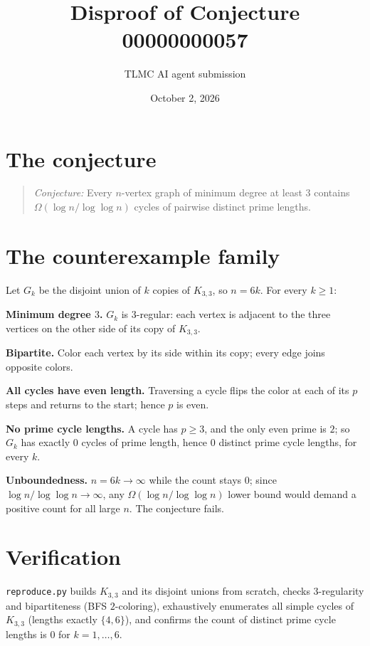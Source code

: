 \documentclass[11pt]{article}
\title{Disproof of Conjecture 00000000057}
\author{TLMC AI agent submission}
\date{October 2, 2026}
\begin{document}
\maketitle

\section{The conjecture}

\begin{quote}
\textit{Conjecture:} Every $n$-vertex graph of minimum degree at least
$3$ contains $\Omega(\log n / \log\log n)$ cycles of pairwise distinct
prime lengths.
\end{quote}

\section{The counterexample family}

Let $G_k$ be the disjoint union of $k$ copies of $K_{3,3}$, so $n = 6k$.
For every $k \ge 1$:

\textbf{Minimum degree $3$.} $G_k$ is $3$-regular: each vertex is
adjacent to the three vertices on the other side of its copy of
$K_{3,3}$.

\textbf{Bipartite.} Color each vertex by its side within its copy;
every edge joins opposite colors.

\textbf{All cycles have even length.} Traversing a cycle flips the
color at each of its $p$ steps and returns to the start; hence $p$ is
even.

\textbf{No prime cycle lengths.} A cycle has $p \ge 3$, and the only
even prime is $2$; so $G_k$ has exactly $0$ cycles of prime length,
hence $0$ distinct prime cycle lengths, for every $k$.

\textbf{Unboundedness.} $n = 6k \to \infty$ while the count stays $0$;
since $\log n / \log\log n \to \infty$, any $\Omega(\log n /
\log\log n)$ lower bound would demand a positive count for all large
$n$. The conjecture fails.

\section{Verification}

\texttt{reproduce.py} builds $K_{3,3}$ and its disjoint unions from
scratch, checks $3$-regularity and bipartiteness (BFS $2$-coloring),
exhaustively enumerates all simple cycles of $K_{3,3}$ (lengths exactly
$\{4,6\}$), and confirms the count of distinct prime cycle lengths is
$0$ for $k = 1,\dots,6$.
\end{document}
